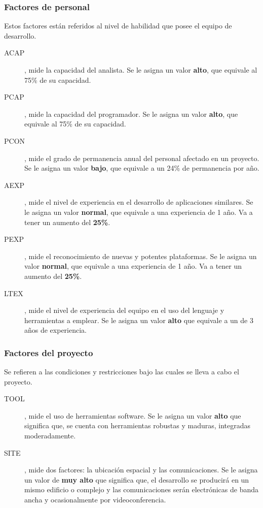 \documentclass[11pt,a4paper,spanish,twoside]{book}
\begin{document}
\subsubsection{Factores de personal}
Estos factores están referidos al nivel de habilidad que posee el equipo de
desarrollo.
\begin{description}
\item[ACAP], mide la capacidad del analista. Se le asigna un valor
\textbf{alto}, que equivale al 75\% de su capacidad.
\item[PCAP], mide la capacidad del programador. Se le asigna un valor
\textbf{alto}, que equivale al 75\% de su capacidad.
\item[PCON], mide el grado de permanencia anual del personal afectado en un
proyecto. Se le asigna un valor \textbf{bajo}, que equivale a un 24\% de
permanencia por año.
\item[AEXP], mide el nivel de experiencia en el desarrollo de aplicaciones
similares. Se le asigna un valor \textbf{normal}, que equivale a una
experiencia de 1 año. Va a tener un aumento del \textbf{25\%}.
\item[PEXP], mide el reconocimiento de nuevas y potentes plataformas. Se le
asigna un valor \textbf{normal}, que equivale a una experiencia de 1 año. Va
a tener un aumento del \textbf{25\%}.
\item[LTEX], mide el nivel de experiencia del equipo en el uso del lenguaje y
herramientas a emplear. Se le asigna un valor \textbf{alto} que
equivale a un de 3 años de experiencia.
\end{description}

\subsubsection{Factores del proyecto}
Se refieren a las condiciones y restricciones bajo las cuales se lleva a cabo
el proyecto.
\begin{description}
\item[TOOL], mide el uso de herramientas software. Se le asigna un valor
\textbf{alto} que significa que, se cuenta con herramientas robustas y
maduras, integradas moderadamente.
\item[SITE], mide dos factores: la ubicación espacial y las comunicaciones.
Se le asigna un valor de \textbf{muy alto} que significa que, el desarrollo
se producirá en un mismo edificio o complejo y las comunicaciones serán
electrónicas de banda ancha y ocasionalmente por videoconferencia.
\end{description}
\end{document}
